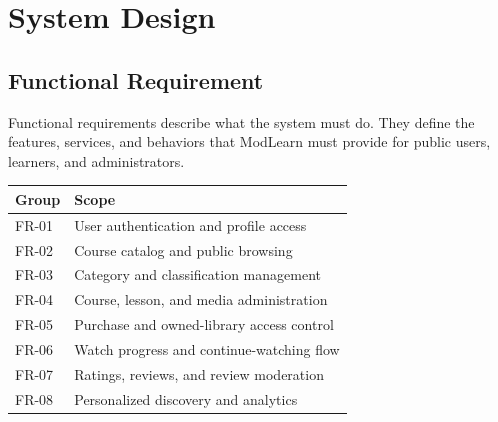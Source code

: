 \section{System Design}

\subsection{Functional Requirement}

Functional requirements describe what the system must do. They define the features, services, and behaviors that ModLearn must provide for public users, learners, and administrators.

\begin{tabularx}{\textwidth}{L{2.2cm}Y}
\toprule
\textbf{Group} & \textbf{Scope} \\
\midrule
FR-01 & User authentication and profile access \\
FR-02 & Course catalog and public browsing \\
FR-03 & Category and classification management \\
FR-04 & Course, lesson, and media administration \\
FR-05 & Purchase and owned-library access control \\
FR-06 & Watch progress and continue-watching flow \\
FR-07 & Ratings, reviews, and review moderation \\
FR-08 & Personalized discovery and analytics \\
\bottomrule
\end{tabularx}


